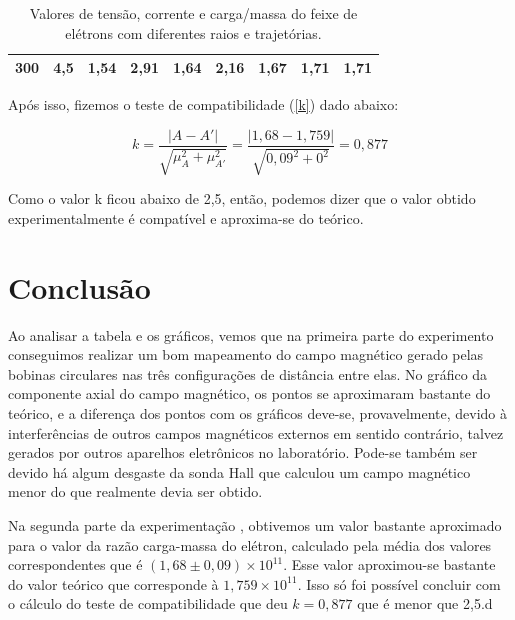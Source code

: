 \documentclass{article}
\begin{document}
\begin{table}[hb]
\begin{tabular}{|c|c|c|c|c|c|c|c|c|}
300                              & 4,5                                    & 1,54                                                                                  & 2,91                                   & 1,64                                                                                  & 2,16                                   & 1,67                                                                                  & 1,71                                   & 1,71                                                                                  \\ \hline
\end{tabular}
\caption{Valores de tensão, corrente e carga/massa do feixe de elétrons com diferentes raios e trajetórias.}
\label{tabqm}
\end{table}

Após isso, fizemos o teste de compatibilidade (\ref{k}) dado abaixo:

\begin{equation}
    \label{k}
    k =\frac{|A-A'|}{\sqrt{\mu _A ^2 + \mu _{A'} ^2}} = \frac{|1,68-1,759|}{\sqrt{0,09^2 + 0^2}} = 0,877
\end{equation}

Como o valor k ficou abaixo de 2,5, então, podemos dizer que o valor obtido experimentalmente é compatível e aproxima-se do teórico. 

\section{Conclusão}
Ao analisar a tabela e os gráficos, vemos que na primeira parte do experimento conseguimos realizar um bom mapeamento do campo magnético gerado pelas bobinas circulares nas três configurações de distância entre elas. No gráfico da componente axial do campo magnético, os pontos se aproximaram bastante do teórico, e a diferença dos pontos com os gráficos deve-se, provavelmente, devido à interferências de outros campos magnéticos externos em sentido contrário, talvez gerados por outros aparelhos eletrônicos no laboratório. Pode-se também ser devido há algum desgaste da sonda Hall que calculou um campo magnético menor do que realmente devia ser obtido.

Na segunda parte da experimentação , obtivemos um valor bastante aproximado para o valor da razão carga-massa do elétron, calculado pela média dos valores correspondentes que é $(1,68 \pm 0,09) \times 10^{11}$. Esse valor aproximou-se bastante do valor teórico que corresponde à  $1,759 \times 10^{11}$. Isso só foi possível concluir com o cálculo do teste de compatibilidade que deu $k=0,877$ que é menor que 2,5.d
\end{document}
